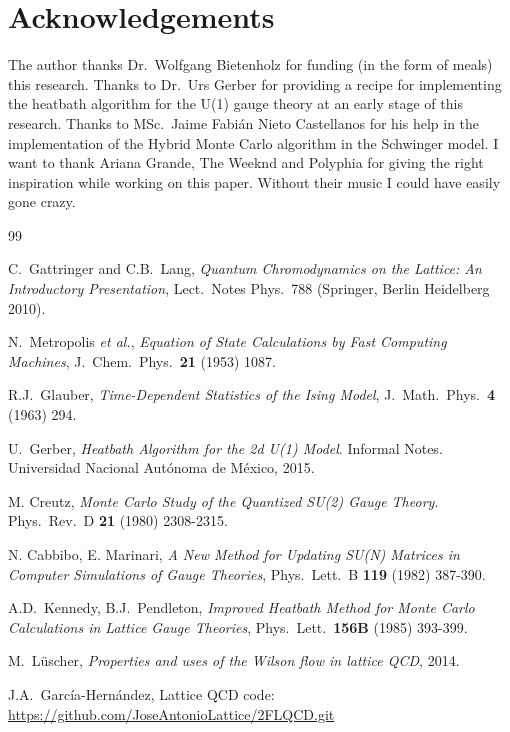 \documentclass[12pt,a4paper]{article}
\begin{document}
\section{Acknowledgements}
The author thanks Dr.\ Wolfgang Bietenholz for funding (in the form of meals) this research. Thanks to Dr.\ Urs Gerber for providing a recipe for implementing the heatbath algorithm for the U(1) gauge theory at an early stage of this research. Thanks to MSc.\ Jaime Fabián Nieto Castellanos for his help in the implementation of the Hybrid Monte Carlo algorithm in the Schwinger model. I want to thank Ariana Grande, The Weeknd and Polyphia for giving the right inspiration while working on this paper. Without their music I could have easily gone crazy.

\begin{thebibliography}{99}

 C.\ Gattringer and C.B.\ Lang, \emph{Quantum Chromodynamics on the Lattice: An Introductory Presentation}, Lect.\ Notes Phys.\ 788 (Springer, Berlin Heidelberg 2010).

 N.\ Metropolis {\it et al.},
\emph{Equation of State Calculations by Fast Computing Machines},
J.\ Chem.\ Phys.\ {\bf 21} (1953) 1087.

 R.J.\ Glauber,
  \emph{Time-Dependent Statistics of the Ising Model},
  J.\ Math.\ Phys.\ {\bf 4} (1963) 294.
  
 U.\ Gerber,
  \emph{Heatbath Algorithm for the 2d U(1) Model}.
  Informal Notes. Universidad Nacional Autónoma de México, 2015.  
  
   M. Creutz, \emph{Monte Carlo Study of the Quantized SU(2) Gauge Theory.} Phys.\ Rev.\ D {\bf 21} (1980) 2308-2315.

 N. Cabbibo, E. Marinari, \emph{A New Method for Updating SU(N) Matrices in Computer Simulations of Gauge Theories}, Phys.\ Lett.\ B {\bf 119} (1982) 387-390.

 A.D.\ Kennedy, B.J.\ Pendleton, \emph{Improved Heatbath Method for Monte Carlo Calculations in Lattice Gauge Theories}, Phys.\ Lett.\ {\bf 156B} (1985) 393-399.

 M.\ L\"uscher, \emph{Properties and uses of the Wilson flow in lattice QCD}, 2014.

 J.A.\ García-Hernández, Lattice QCD code: \url{https://github.com/JoseAntonioLattice/2FLQCD.git}
\end{thebibliography}
\end{document}
